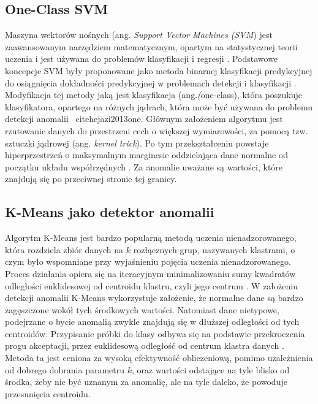 \documentclass[a4paper,twoside,12pt]{book}
\begin{document}
	\subsection{One-Class SVM}
	Maszyna wektorów nośnych (ang. \textit{Support Vector Machines (SVM}) jest zaawansowanym narzędziem matematycznym, opartym na statystycznej teorii uczenia i jest używana do problemów klasyfikacji i regresji \cite{hejazi2013one}. Podstawowe koncepcje SVM były proponowane jako metoda binarnej klasyfikacji predykcyjnej do osiągnięcia dokładności predykcyjnej w problemach detekcji i klasyfikacji \cite{hejazi2013one}. Modyfikacja tej metody jaką jest klasyfikacja (ang.\textit(one-class), która poszukuje klasyfikatora, opartego na różnych jądrach, która może być używana do problemu detekcji anomalii \ cite{hejazi2013one}. Głównym założeniem algorytmu jest rzutowanie danych do przestrzeni cech o większej wymiarowości, za pomocą tzw. sztuczki jądrowej (ang. \textit{kernel trick}). Po tym przekształceniu powstaje hiperprzestrzeń o maksymalnym marginesie oddzielająca dane normalne od początku układu współrzędnych \cite{hejazi2013one}. Za anomalie uważane są wartości, które znajdują się po przeciwnej stronie tej granicy.
	
	\subsection{K-Means jako detektor anomalii}
	Algorytm K-Means jest bardzo popularną metodą uczenia nienadzorowanego, która rozdziela zbiór danych na $k$ rozłącznych grup, nazywanych klastrami, o czym było wspomniane przy wyjaśnieniu pojęcia uczenia nienadzorowanego. Proces działania opiera się na iteracyjnym minimalizowaniu sumy kwadratów odległości euklidesowej od centroidu klastru, czyli jego centrum \cite{lima2010anomaly}. W założeniu detekcji anomalii K-Means wykorzystuje założenie, że normalne dane są bardzo zagęszczone wokół tych środkowych wartości. Natomiast dane nietypowe, podejrzane o bycie anomalią zwykle znajdują się w dłuższej odległości od tych centroidów. Przypisanie próbki do klasy odbywa się na podstawie przekroczenia progu akceptacji, przez euklidesową odległość od centrum klastra danych \cite{munz2007traffic}. Metoda ta jest ceniona za wysoką efektywność obliczeniową, pomimo uzależnienia od dobrego dobrania parametru $k$, oraz wartości odstające na tyle blisko od środka, żeby nie być uznanym za anomalię, ale na tyle daleko, że powoduje przesunięcia centroidu. 
	
\end{document}

